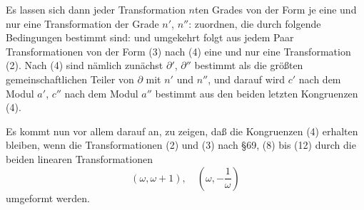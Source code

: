 Es lassen sich dann jeder Transformation $n$ten Grades von
der Form
je eine und nur eine Transformation der Grade $n'$, $n''$:
zuordnen, die durch folgende Bedingungen bestimmt sind:
und umgekehrt folgt aus jedem Paar Transformationen von der
Form (3) nach (4) eine und nur eine Transformation (2). Nach
(4) sind nämlich zunächst $\partial'$, $\partial''$ bestimmt als die größten gemeinschaftlichen
Teiler von $\partial$ mit $n'$ und $n''$, und darauf wird $c'$ nach
dem Modul $a'$, $c''$ nach dem Modul $a''$ bestimmt aus den beiden
letzten Kongruenzen (4).

Es kommt nun vor allem darauf an, zu zeigen, daß die
Kongruenzen (4) erhalten bleiben, wenn die Transformationen (2)
und (3) nach \S 69, (8) bis (12) durch die beiden linearen Transformationen
\[
(\omega, \omega+1), \quad \left(\omega, -\frac{1}{\omega}\right)
\]
umgeformt werden.

